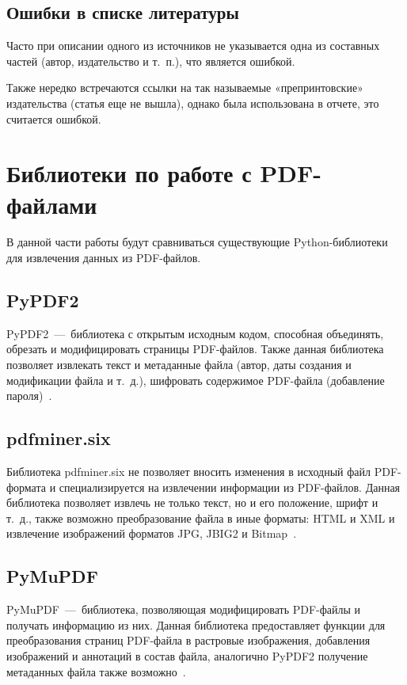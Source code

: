 \subsection{Ошибки в списке литературы}
Часто при описании одного из источников не указывается одна из составных частей (автор, издательство и т.~п.), что является ошибкой.

Также нередко встречаются ссылки на так называемые «препринтовские» издательства (статья еще не вышла), однако была использована в отчете, это считается ошибкой.

\section{Библиотеки по работе с PDF-файлами}
В данной части работы будут сравниваться существующие Python-библиотеки для извлечения данных из PDF-файлов.
\subsection{PyPDF2}
PyPDF2~---~библиотека с открытым исходным кодом, способная объединять, обрезать и модифицировать страницы PDF-файлов. Также данная библиотека позволяет извлекать текст и метаданные файла (автор, даты создания и модификации файла и т.~д.), шифровать содержимое PDF-файла (добавление пароля)~\cite{PyPDF2_docs}.
\subsection{pdfminer.six}
Библиотека pdfminer.six не позволяет вносить изменения в исходный файл PDF-формата и специализируется на извлечении информации из PDF-файлов. Данная библиотека позволяет извлечь не только текст, но и его положение, шрифт и т.~д., также возможно преобразование файла в иные форматы: HTML и XML и извлечение изображений форматов JPG, JBIG2 и Bitmap~\cite{pdfminersix_docs}.
\subsection{PyMuPDF}
PyMuPDF~---~библиотека, позволяющая модифицировать PDF-файлы и получать информацию из них. Данная библиотека предоставляет функции для преобразования страниц PDF-файла в растровые изображения, добавления изображений и аннотаций в состав файла, аналогично PyPDF2 получение метаданных файла также возможно~\cite{PyMuPDF_docs}.

